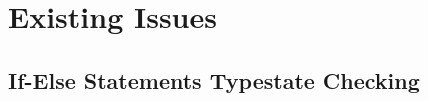 \documentclass[]{article}
\begin{document}
\section{Existing Issues}
\subsection{If-Else Statements Typestate Checking}


%
\end{document}
